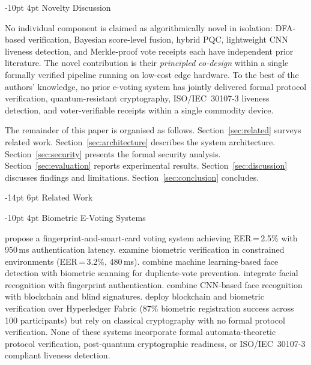 \documentclass[a4paper,12pt]{article}
\makeatletter
\renewcommand\section{\@startsection{section}{1}{\z@}%
  {-14pt \@plus -4pt \@minus -2pt}{6pt \@plus 2pt}%
  {\normalfont\large\bfseries}}
\renewcommand\subsection{\@startsection{subsection}{2}{\z@}%
  {-10pt \@plus -3pt \@minus -2pt}{4pt \@plus 2pt}%
  {\normalfont\normalsize\itshape}}
\newcommand{\textcite}[1]{\citet{#1}}
\makeatother
\begin{document}
\subsection{Novelty Discussion}

No individual component is claimed as algorithmically novel in isolation:
DFA-based verification, Bayesian score-level fusion, hybrid PQC,
lightweight CNN liveness detection, and Merkle-proof vote receipts each
have independent prior literature. The novel contribution is their
\emph{principled co-design} within a single formally verified pipeline
running on low-cost edge hardware. To the best of the authors' knowledge,
no prior e-voting system has jointly delivered formal protocol
verification, quantum-resistant cryptography, ISO/IEC~30107-3 liveness
detection, and voter-verifiable receipts within a single commodity device.

The remainder of this paper is organised as follows.
Section~\ref{sec:related} surveys related work.
Section~\ref{sec:architecture} describes the system architecture.
Section~\ref{sec:security} presents the formal security analysis.
Section~\ref{sec:evaluation} reports experimental results.
Section~\ref{sec:discussion} discusses findings and limitations.
Section~\ref{sec:conclusion} concludes.

\section{Related Work}\label{sec:related}

\subsection{Biometric E-Voting Systems}

\textcite{bello2021biometric} propose a fingerprint-and-smart-card voting
system achieving EER\,=\,2.5\% with 950\,ms authentication latency.
\textcite{sanchez2020biometric} examine biometric verification in
constrained environments (EER\,=\,3.2\%, 480\,ms).
\textcite{komatineni2020biometric} combine machine learning-based face
detection with biometric scanning for duplicate-vote prevention.
\textcite{nagaraj2022voting} integrate facial recognition with fingerprint
authentication. \textcite{revathy2022cnn_evoting} combine CNN-based face
recognition with blockchain and blind signatures.
\textcite{faruk2024transforming} deploy blockchain and biometric
verification over Hyperledger Fabric (87\% biometric registration success
across 100 participants) but rely on classical cryptography with no formal
protocol verification. None of these systems incorporate formal
automata-theoretic protocol verification, post-quantum cryptographic
readiness, or ISO/IEC~30107-3 compliant liveness detection.
\end{document}

